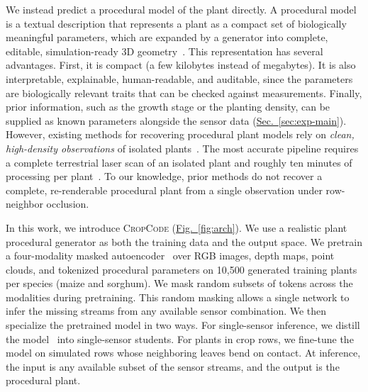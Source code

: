 \documentclass[10pt,twocolumn,letterpaper]{article}
\newcommand{\figref}[1]{\hyperref[#1]{Fig.~\ref*{#1}}}
\newcommand{\secref}[1]{\hyperref[#1]{Sec.~\ref*{#1}}}
\newcommand{\method}{\textup{\textsc{CropCode}}}   %
\begin{document}
We instead predict a procedural model of the plant directly. A procedural model is a textual description that represents a plant as a compact set of biologically meaningful parameters, which are expanded by a generator into complete, editable, simulation-ready 3D geometry~\citep{prusin1990abop, floraforge2026}. This representation has several advantages. First, it is compact (a few kilobytes instead of megabytes). It is also interpretable, explainable, human-readable, and auditable, since the parameters are biologically relevant traits that can be checked against measurements. Finally, prior information, such as the growth stage or the planting density, can be supplied as known parameters alongside the sensor data (\secref{sec:exp-main}). However, existing methods for recovering procedural plant models rely on \textit{clean, high-density observations} of isolated plants~\citep{cropcraft2026,demeter2025, ghrer2025paramplants}. The most accurate pipeline requires a complete terrestrial laser scan of an isolated plant and roughly ten minutes of processing per plant~\citep{hadadi2026vlmmaize}. To our knowledge, prior methods do not recover a complete, re-renderable procedural plant from a single observation under row-neighbor occlusion.

In this work, we introduce \method{} (\figref{fig:arch}). We use a realistic plant procedural generator as both the training data  and the output space. We pretrain a four-modality masked autoencoder~\citep{he2022mae,bachmann2022multimae,mizrahi2023fourm,dong2025embodiedmae} over RGB images, depth maps, point clouds, and tokenized procedural parameters on 10{,}500 generated training plants per species (maize and sorghum). We mask random subsets of tokens across the modalities during pretraining. This random masking allows a single network to infer the missing streams from any available sensor combination. We then specialize the pretrained model in two ways. For single-sensor inference, we distill the model~\citep{hinton2015distillation} into single-sensor students. For plants in crop rows, we fine-tune the model on simulated rows whose neighboring leaves bend on contact. At inference, the input is any available subset of the sensor streams, and the output is the procedural plant.
\end{document}
